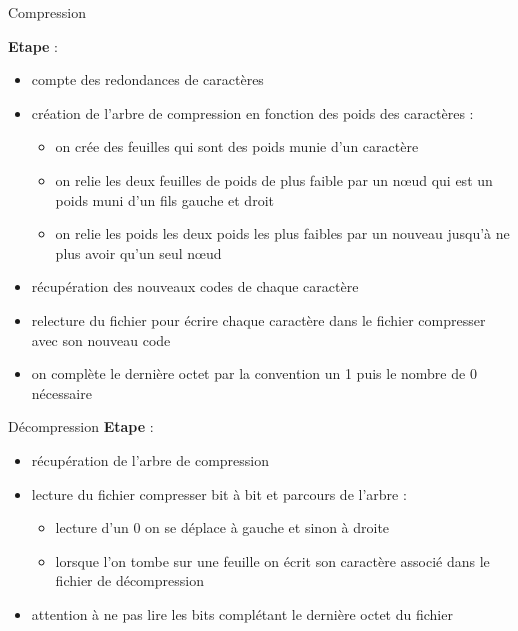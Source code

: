 \documentclass[french]{beamer}
\begin{document}
\begin{frame}{Compression}

	\textbf{Etape} :\\
	
\begin{itemize}
	\item compte des redondances de caractères
	\item création de l'arbre de compression en fonction des poids des caractères :
		\begin{itemize}
			\item on crée des feuilles qui sont des poids munie d'un caractère
			\item on relie les deux feuilles de poids de plus faible par un nœud qui est un poids muni d'un fils gauche et droit
			\item on relie les poids les deux poids les plus faibles par un nouveau  jusqu'à ne plus avoir qu'un seul nœud
		\end{itemize}
	\item récupération des nouveaux codes de chaque caractère
	\item relecture du fichier pour écrire chaque caractère dans le fichier compresser avec son nouveau code
	\item on complète le dernière octet par la convention un 1 puis le nombre de 0 nécessaire
	\end{itemize}

\end{frame}

\begin{frame}{Décompression}
\textbf{Etape} :\\
\begin{itemize}
\item<1-5> récupération de l'arbre de compression
\item<2-5> lecture du fichier compresser bit à bit et parcours de l'arbre :
	\begin{itemize}
		\item<3-5> lecture d'un 0 on se déplace à gauche et sinon à droite
		\item<4-5> lorsque l'on tombe sur une feuille on écrit son caractère associé dans le fichier de décompression
	\end{itemize}
\item<5> attention à ne pas lire les bits complétant le dernière octet du fichier
\end{itemize}
\end{frame}
\end{document}
